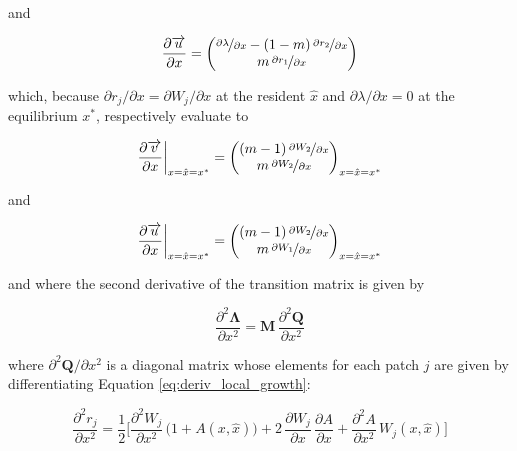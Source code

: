 and

\begin{equation}
    \frac{\partial \overrightarrow{u}}{\partial x} = 
    \begin{pmatrix}
        \nicefrac{\partial \lambda}{\partial x} - (1-m)\,\nicefrac{\partial r_2}{\partial x}\\
        m\,\nicefrac{\partial r_1}{\partial x}
    \end{pmatrix}
\end{equation}

which, because $\partial r_j / \partial x = \partial W_j / \partial x$ at the resident $\hat x$ and $\partial \lambda / \partial x = 0$ at the equilibrium $x^*$, respectively evaluate to

\begin{equation}
    \frac{\partial \overrightarrow{v}}{\partial x}\bigg|_{x=\hat x=x^*} = 
    \begin{pmatrix}
        (m-1)\,\nicefrac{\partial W_2}{\partial x}\\
        m\,\nicefrac{\partial W_2}{\partial x}
    \end{pmatrix}
    _{x=\hat x=x^*}
\end{equation}

and

\begin{equation}
    \frac{\partial \overrightarrow{u}}{\partial x}\bigg|_{x=\hat x=x^*} = 
    \begin{pmatrix}
        (m-1)\,\nicefrac{\partial W_2}{\partial x}\\
        m\,\nicefrac{\partial W_1}{\partial x}
    \end{pmatrix}
    _{x=\hat x=x^*}
    \label{eq:right_eigenvector_equilibrium}
\end{equation}

and where the second derivative of the transition matrix is given by 

\begin{equation}
    \frac{\partial^2 \pmb{\Lambda}}{\partial x^2} = \pmb{M} \, \frac{\partial^2 \pmb{Q}}{\partial x^2}
    \label{eq:second_derivative_transition}
\end{equation}

where $\partial^2 \pmb{Q} / \partial x^2$ is a diagonal matrix whose elements for each patch $j$ are given by differentiating Equation \ref{eq:deriv_local_growth}:

\begin{equation}
    \frac{\partial^2 r_j}{\partial x^2} = \frac{1}{2} \bigg[\frac{\partial^2 W_j}{\partial x^2}\,\big(1+A(x,\hat{x})\big) + 2\,\frac{\partial W_j}{\partial x}\,\frac{\partial A}{\partial x} + \frac{\partial^2 A}{\partial x^2}\,W_j(x,\hat{x})\bigg]
\end{equation}

